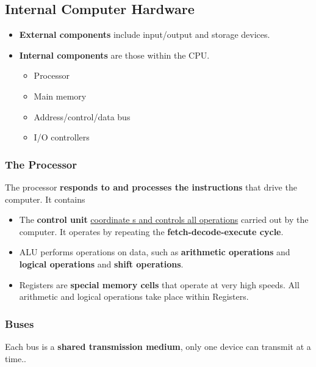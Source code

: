 \subsection{Internal Computer Hardware}

\begin{itemize}
    \item \textbf{External components} include input/output and storage devices.
    \item \textbf{Internal components} are those within the CPU.
        \begin{itemize}
            \item Processor
            \item Main memory
            \item Address/control/data bus
            \item I/O controllers
        \end{itemize}
\end{itemize}

\subsubsection*{The Processor}

The processor \textbf{responds to and processes the instructions} that drive the computer. It contains
\begin{itemize}
    \item The \textbf{control unit} \underline{coordinate s and controls all operations} carried out by the computer. It operates by repeating the \textbf{fetch-decode-execute cycle}.
    \item ALU performs operations on data, such as \textbf{arithmetic operations} and \textbf{logical operations} and \textbf{shift operations}.
    \item Registers are \textbf{special memory cells} that operate at very high speeds. All arithmetic and logical operations take place within Registers.
\end{itemize}

\subsubsection*{Buses}

Each bus is a \textbf{shared transmission medium}, only one device can transmit at a time..

